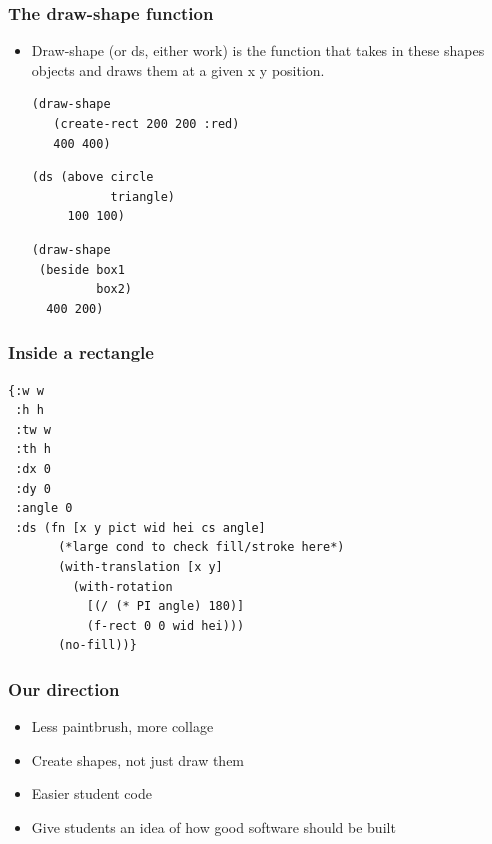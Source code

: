 \documentclass{beamer}
\begin{document}
\begin{frame}[fragile]
	\frametitle{The draw-shape function}
	\begin{itemize}
	\item Draw-shape (or ds, either work) is the function that takes in these shapes objects and draws them at a given x y position.
		\begin{verbatim}
(draw-shape 
   (create-rect 200 200 :red) 
   400 400)
		\end{verbatim}
		\begin{verbatim}
(ds (above circle
           triangle)
     100 100)
		\end{verbatim}
		\begin{verbatim}
(draw-shape 
 (beside box1
         box2)
  400 200)

		\end{verbatim}
	\end{itemize}
\end{frame}


\begin{frame}[fragile]
	\frametitle{Inside a rectangle}
		\begin{verbatim}
{:w w
 :h h
 :tw w
 :th h
 :dx 0
 :dy 0
 :angle 0
 :ds (fn [x y pict wid hei cs angle]
       (*large cond to check fill/stroke here*)
       (with-translation [x y]
         (with-rotation 
           [(/ (* PI angle) 180)] 
           (f-rect 0 0 wid hei)))
       (no-fill))}
		\end{verbatim}		
\end{frame}



\begin{frame}
	\frametitle{Our direction}
	\begin{itemize}
		\item Less paintbrush, more collage
		\item Create shapes, not just draw them
		\item Easier student code
		\item Give students an idea of how good software should be built              
	\end{itemize}
\end{frame}
\end{document}
